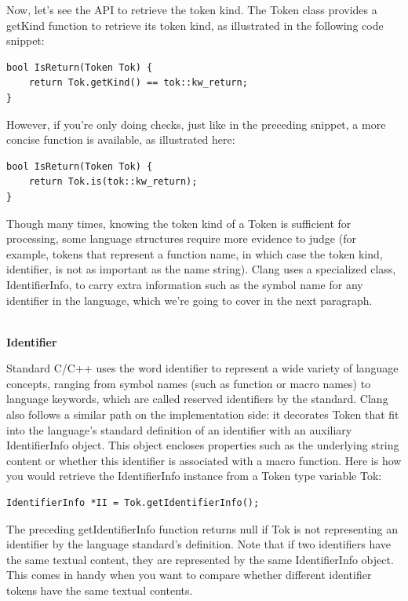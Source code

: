 Now, let's see the API to retrieve the token kind. The Token class provides a getKind function to retrieve its token kind, as illustrated in the following code snippet:

\begin{lstlisting}[style=styleCXX]
bool IsReturn(Token Tok) {
	return Tok.getKind() == tok::kw_return;
}
\end{lstlisting}

However, if you're only doing checks, just like in the preceding snippet, a more concise function is available, as illustrated here:

\begin{lstlisting}[style=styleCXX]
bool IsReturn(Token Tok) {
	return Tok.is(tok::kw_return);
}
\end{lstlisting}

Though many times, knowing the token kind of a Token is sufficient for processing, some language structures require more evidence to judge (for example, tokens that represent a function name, in which case the token kind, identifier, is not as important as the name string). Clang uses a specialized class, IdentifierInfo, to carry extra information such as the symbol name for any identifier in the language, which we're going to cover in the next paragraph.

\hspace*{\fill} \\ %
\noindent
\textbf{Identifier}

Standard C/C++ uses the word identifier to represent a wide variety of language concepts, ranging from symbol names (such as function or macro names) to language keywords, which are called reserved identifiers by the standard. Clang also follows a similar path on the implementation side: it decorates Token that fit into the language's standard definition of an identifier with an auxiliary IdentifierInfo object. This object encloses properties such as the underlying string content or whether this identifier is associated with a macro function. Here is how you would retrieve the IdentifierInfo instance from a Token type variable Tok:

\begin{lstlisting}[style=styleCXX]
IdentifierInfo *II = Tok.getIdentifierInfo();
\end{lstlisting}

The preceding getIdentifierInfo function returns null if Tok is not representing an identifier by the language standard's definition. Note that if two identifiers have the same textual content, they are represented by the same IdentifierInfo object. This comes in handy when you want to compare whether different identifier tokens have the same textual contents.

